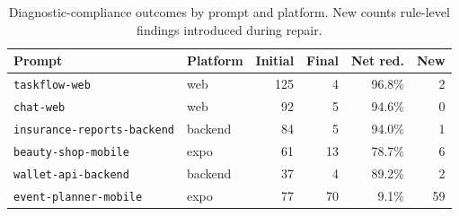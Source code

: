 \begin{table}[ht]
  \centering
  \scriptsize
  \begin{tabular}{llrrrr}
    \toprule
    Prompt & Platform & Initial & Final & Net red. & New \\
    \midrule
    \texttt{taskflow-web} & web & 125 & 4 & 96.8\% & 2 \\
    \texttt{chat-web} & web & 92 & 5 & 94.6\% & 0 \\
    \texttt{insurance-reports-backend} & backend & 84 & 5 & 94.0\% & 1 \\
    \texttt{beauty-shop-mobile} & expo & 61 & 13 & 78.7\% & 6 \\
    \texttt{wallet-api-backend} & backend & 37 & 4 & 89.2\% & 2 \\
    \texttt{event-planner-mobile} & expo & 77 & 70 & 9.1\% & 59 \\
    \bottomrule
  \end{tabular}
  \caption{Diagnostic-compliance outcomes by prompt and platform. New counts rule-level findings introduced during repair.}
  \label{tab:repair-by-prompt}
\end{table}
